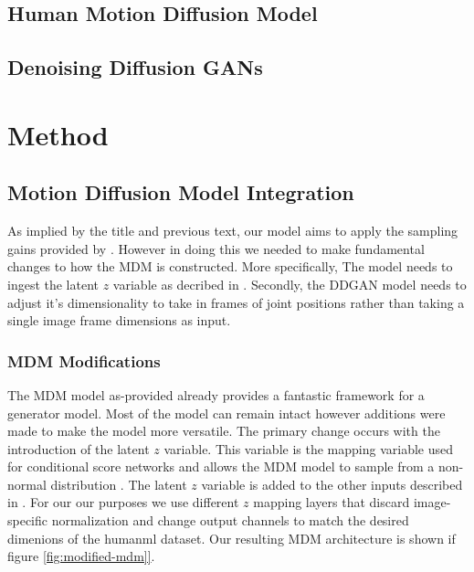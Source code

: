 \documentclass[10pt,twocolumn,letterpaper]{article}
\begin{document}
\subsection{Human Motion Diffusion Model}

\subsection{Denoising Diffusion GANs}


\section{Method}
\label{sec:method}

\subsection{Motion Diffusion Model Integration}
As implied by the title and previous text, our model aims to apply the sampling gains provided by \cite{Xiao22}. However in doing this we needed to make fundamental changes to how the MDM is constructed. More specifically, The model needs to ingest the latent $z$ variable as decribed in \cite{Xiao22}. Secondly, the DDGAN model needs to adjust it's dimensionality to take in frames of joint positions rather than taking a single image frame dimensions as input.

\subsubsection{MDM Modifications}

The MDM model as-provided already provides a fantastic framework for a generator model. Most of the model can remain intact however additions were made to make the model more versatile. The primary change occurs with the introduction of the latent $z$ variable. This variable is the mapping variable used for conditional score networks and allows the MDM model to sample from a non-normal distribution \cite{xiao2022tackling}. The latent $z$ variable is added to the other inputs described in \cite{Tevet23}. For our our purposes we use different $z$ mapping layers that discard image-specific normalization and change output channels to match the desired dimenions of the humanml dataset.  Our resulting MDM architecture is shown if figure \ref{fig:modified-mdm]}. \par
\end{document}
